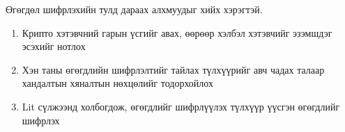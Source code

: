 Өгөгдөл шифрлэхийн тулд дараах алхмуудыг хийх хэрэгтэй.
\begin{enumerate}
   \item Крипто хэтэвчний гарын үсгийг авах, өөрөөр хэлбэл хэтэвчийг эзэмшдэг эсэхийг нотлох
   \item Хэн таны өгөгдлийн шифрлэлтийг тайлах түлхүүрийг авч чадах талаар хандалтын хяналтын нөхцөлийг тодорхойлох
   \item Lit сүлжээнд холбогдож, өгөгдлийг шифрлүүлэх түлхүүр үүсгэн өгөгдлийг шифрлэх
\end{enumerate}